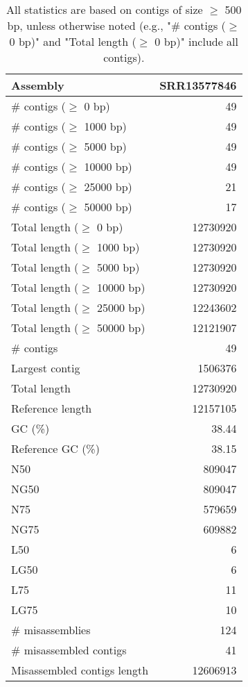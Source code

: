 \documentclass[12pt,a4paper]{article}
\begin{document}
\begin{table}[ht]
\begin{center}
\caption{All statistics are based on contigs of size $\geq$ 500 bp, unless otherwise noted (e.g., "\# contigs ($\geq$ 0 bp)" and "Total length ($\geq$ 0 bp)" include all contigs).}
\begin{tabular}{|l*{1}{|r}|}
\hline
Assembly & SRR13577846 \\ \hline
\# contigs ($\geq$ 0 bp) & 49 \\ \hline
\# contigs ($\geq$ 1000 bp) & 49 \\ \hline
\# contigs ($\geq$ 5000 bp) & 49 \\ \hline
\# contigs ($\geq$ 10000 bp) & 49 \\ \hline
\# contigs ($\geq$ 25000 bp) & 21 \\ \hline
\# contigs ($\geq$ 50000 bp) & 17 \\ \hline
Total length ($\geq$ 0 bp) & 12730920 \\ \hline
Total length ($\geq$ 1000 bp) & 12730920 \\ \hline
Total length ($\geq$ 5000 bp) & 12730920 \\ \hline
Total length ($\geq$ 10000 bp) & 12730920 \\ \hline
Total length ($\geq$ 25000 bp) & 12243602 \\ \hline
Total length ($\geq$ 50000 bp) & 12121907 \\ \hline
\# contigs & 49 \\ \hline
Largest contig & 1506376 \\ \hline
Total length & 12730920 \\ \hline
Reference length & 12157105 \\ \hline
GC (\%) & 38.44 \\ \hline
Reference GC (\%) & 38.15 \\ \hline
N50 & 809047 \\ \hline
NG50 & 809047 \\ \hline
N75 & 579659 \\ \hline
NG75 & 609882 \\ \hline
L50 & 6 \\ \hline
LG50 & 6 \\ \hline
L75 & 11 \\ \hline
LG75 & 10 \\ \hline
\# misassemblies & 124 \\ \hline
\# misassembled contigs & 41 \\ \hline
Misassembled contigs length & 12606913 \\ \hline

\end{tabular}
\end{center}
\end{table}
\end{document}
